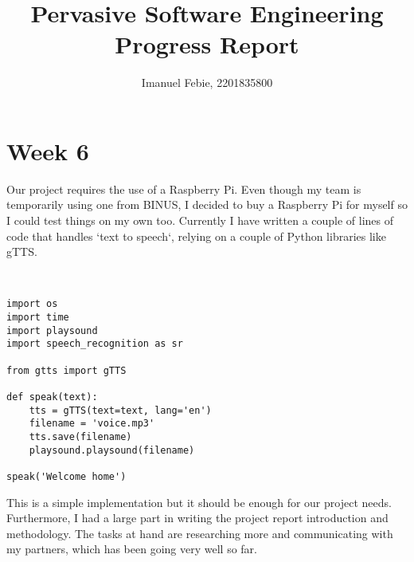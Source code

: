 \documentclass[12pt]{article}
\begin{document}
\title{Pervasive Software Engineering \\ \large Progress Report}
\author{Imanuel Febie, 2201835800}
\maketitle

\section*{Week 6}
Our project requires the use of a Raspberry Pi. Even though my team is temporarily using one from BINUS, I decided to buy a Raspberry Pi for myself so I could test things on my own too. Currently I have written a couple of lines of code that handles `text to speech`, relying on a couple of Python libraries like gTTS.

\\

\lstset{
    language=python,
    numbers=left,
    firstnumber=1,
    numberfirstline=true
}
\begin{lstlisting}[frame=single]
import os
import time
import playsound
import speech_recognition as sr

from gtts import gTTS

def speak(text):
    tts = gTTS(text=text, lang='en')
    filename = 'voice.mp3'
    tts.save(filename)
    playsound.playsound(filename)

speak('Welcome home')
\end{lstlisting}

This is a simple implementation but it should be enough for our project needs. Furthermore, I had a large part in writing the project report introduction and methodology. The tasks at hand are researching more and communicating with my partners, which has been going very well so far.
\end{document}
